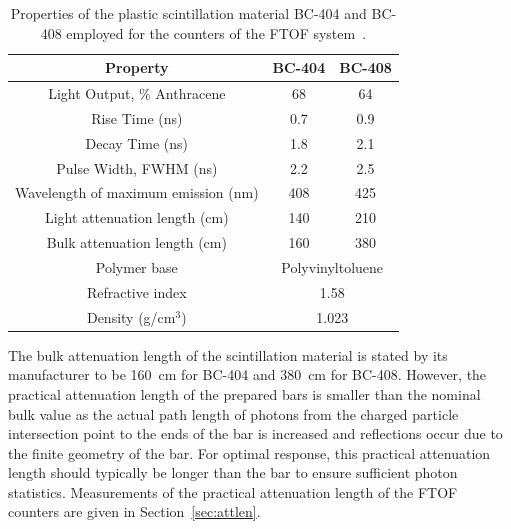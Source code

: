 \documentclass{elsart}
\begin{document}
\begin{table}[htbp]
\begin{center}
\begin{tabular}{c|c|c} \hline
Property                                    & BC-404     & BC-408  \\ \hline    
Light Output, \% Anthracene  & 68             &  64    \\ \hline
Rise Time (ns)                           & 0.7             & 0.9    \\ \hline
Decay Time (ns)                         & 1.8             & 2.1     \\ \hline
Pulse Width, FWHM (ns)         & 2.2              & 2.5    \\ \hline
Wavelength of maximum emission (nm) & 408    & 425 \\ \hline
Light attenuation length (cm)   & 140             & 210   \\ \hline
Bulk attenuation length (cm)     & 160             & 380  \\ \hline
Polymer base                             & \multicolumn{2}{c}{Polyvinyltoluene} \\ \hline
Refractive index                       & \multicolumn{2}{c}{1.58}                    \\ \hline 
Density (g/cm$^3$)                  & \multicolumn{2}{c}{1.023}                    \\ \hline 
\end{tabular}
\end{center}
\caption{Properties of the plastic scintillation material BC-404 and BC-408 employed for the counters
of the FTOF system~\cite{scint-mat-ref}.}
\label{scint-specs}
\end{table}

The bulk attenuation length of the scintillation material is stated by its manufacturer to be 160~cm
for BC-404 and 380~cm for BC-408. However, the practical attenuation length of the prepared bars
is smaller than the nominal bulk value as the actual path length of photons from the charged particle
intersection point to the ends of the bar is increased and reflections occur due to the finite geometry
of the bar. For optimal response, this practical attenuation length should typically be longer than the
bar to ensure sufficient photon statistics. Measurements of the practical attenuation length of the
FTOF counters are given in Section~\ref{sec:attlen}.
\end{document}

